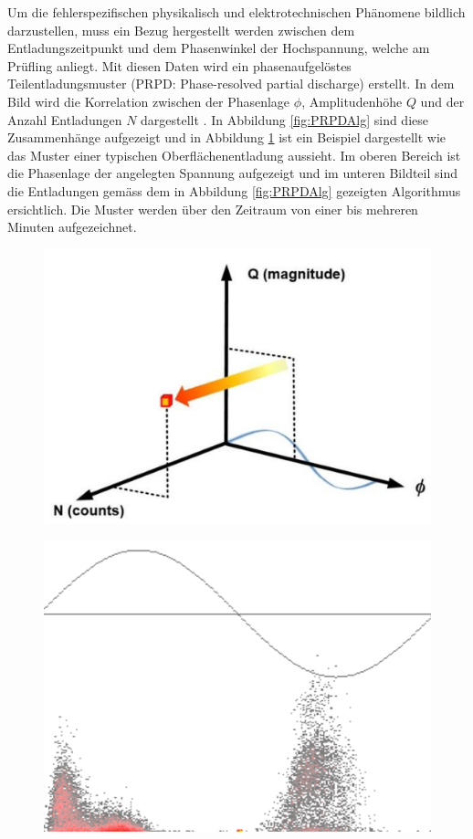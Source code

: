 \begin{refsection}
Um die fehlerspezifischen physikalisch und elektrotechnischen Phänomene bildlich darzustellen, muss ein Bezug hergestellt werden zwischen dem Entladungszeitpunkt und dem Phasenwinkel der Hochspannung, welche am Prüfling anliegt. 
Mit diesen Daten wird ein phasenaufgelöstes Teilentladungsmuster (PRPD: Phase-resolved partial discharge) erstellt. 
In dem Bild wird die Korrelation zwischen der Phasenlage $\phi$, Amplitudenhöhe $Q$ und der Anzahl Entladungen $N$ dargestellt \cite{buch:UHFSignale}. 
In Abbildung \ref{fig:PRPDAlg} sind diese Zusammenhänge aufgezeigt und in Abbildung \ref{fig:PRPDHohl} 
ist ein Beispiel dargestellt wie das Muster einer typischen Oberflächenentladung aussieht. 
Im oberen Bereich ist die Phasenlage der angelegten Spannung aufgezeigt und im unteren Bildteil sind die Entladungen gemäss dem in Abbildung \ref{fig:PRPDAlg} gezeigten Algorithmus ersichtlich.
Die Muster werden über den Zeitraum von einer bis mehreren Minuten aufgezeichnet.
\begin{figure}
	\centering
	\begin{minipage}{.5\textwidth}
		\centering
		\includegraphics[width=.9\linewidth]{papers/gis/Bilder/PERP}
		\label{fig:PRPDAlg}
	\end{minipage}%
	\begin{minipage}{.5\textwidth}
		\centering
		\includegraphics[width=.8\linewidth]{papers/gis/Bilder/OberflaechenentladungPRPD}
		\label{fig:PRPDHohl}
	\end{minipage}
\end{figure}



\end{refsection}
